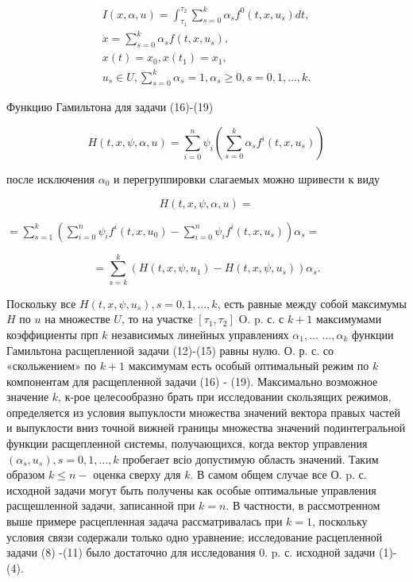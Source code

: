 \documentclass[10pt]{article}
\begin{document}
\[
\begin{gathered}
I(x, \alpha, u)=\int_{\tau_{1}}^{\tau_{2}} \sum_{s=0}^{k} \alpha_{s} f^{0}\left(t, x, u_{s}\right) d t, \\
\dot{x}=\sum_{s=0}^{k} \alpha_{s} f\left(t, x, u_{s}\right), \\
x(t)=x_{0}, x\left(t_{1}\right)=x_{1}, \\
u_{s} \in U, \sum_{s=0}^{k} \alpha_{s}=1, \alpha_{s} \geqslant 0, s=0,1, \ldots, k .
\end{gathered}
\]

Функцию Гамильтона для задачи (16)-(19)

\[
H(t, x, \psi, \alpha, u)=\sum_{i=0}^{n} \psi_{i}\left(\sum_{s=0}^{k} \alpha_{s} f^{i}\left(t, x, u_{s}\right)\right)
\]

после исключения $\alpha_{0}$ и перегруппировки слагаемых можно шривести к виду

\[
H(t, x, \psi, \alpha, u)=
\]

$=\sum_{s=1}^{k}\left(\sum_{i=0}^{n} \psi_{i} f^{i}\left(t, x, u_{0}\right)-\sum_{i=0}^{n} \psi_{i} f^{i}\left(t, x, u_{s}\right)\right) \alpha_{s}=$

\[
=\sum_{s=k}^{k}\left(H\left(t, x, \psi, u_{1}\right)-H\left(t, x, \psi, u_{s}\right)\right) \alpha_{s} .
\]

Поскольку все $H\left(t, x, \psi, u_{s}\right), s=0,1, \ldots, k$, есть равные между собой максимумы $H$ по $u$ на множестве $U$, то на участке $\left[\tau_{1}, \tau_{2}\right]$ O. p. с. с $k+1$ максимумами коэффициенты прп $k$ независимых линейных управлениях $\alpha_{1}, \ldots$ $\ldots, \alpha_{k}$ функции Гамильтона расщепленной задачи (12)-(15) равны нулю. О. р. с. со «скольжением» по $k+1$ максимумам есть особый оптимальный режим по $k$ компонентам для расщепленной задачи (16) - (19). Максимально возможное значение $k$, к-рое целесообразно брать при исследовании скользящих режимов, определяется из условия выпуклости множества значений вектора правых частей и выпуклости вниз точной вижней границы множества значений подинтегральной функции расщепленной системы, получающихся, когда вектор управления $\left(\alpha_{s}, u_{s}\right), s=0,1, \ldots, k$ пробегает всіо допустимую область значений. Таким образом $k \leqslant n-$ оценка сверху для $k$. В самом общем случае все О. p. с. исходной задачи могут быть получены как особые оптимальные управления расщешленной задачи, записанной при $k=n$. В частности, в рассмотренном выше примере расцепленная задача рассматривалась при $k=1$, поскольку условия связи содержали только одно уравнение; исследование расцепленной задачи (8) -(11) было достаточно для исследования 0. p. с. исходной задачи (1)-(4).
\end{document}
